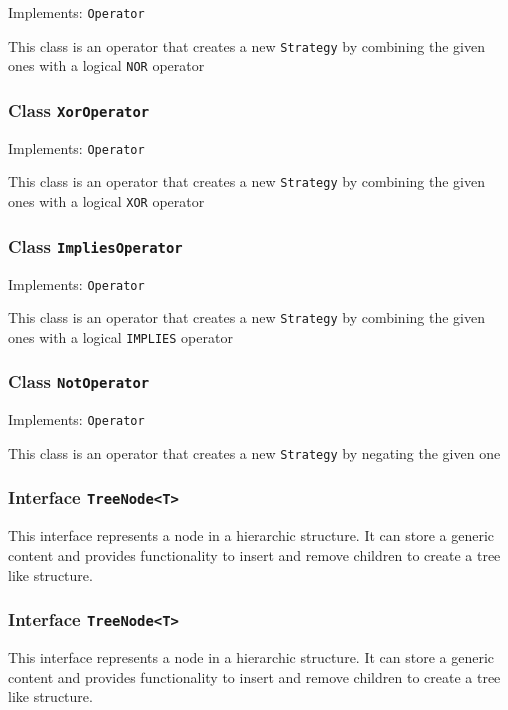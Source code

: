 \documentclass[parskip=full,11pt]{scrartcl}
\begin{document}
Implements: \texttt{Operator}

This class is an operator that creates a new \texttt{Strategy} by combining the given ones with a logical \texttt{NOR} operator

\subsubsection{Class \texttt{XorOperator}}

Implements: \texttt{Operator}

This class is an operator that creates a new \texttt{Strategy} by combining the given ones with a logical \texttt{XOR} operator

\subsubsection{Class \texttt{ImpliesOperator}}

Implements: \texttt{Operator}

This class is an operator that creates a new \texttt{Strategy} by combining the given ones with a logical \texttt{IMPLIES} operator

\subsubsection{Class \texttt{NotOperator}}

Implements: \texttt{Operator}

This class is an operator that creates a new \texttt{Strategy} by negating the given one

\subsubsection{Interface \texttt{TreeNode<T>}}

This interface represents a node in a hierarchic structure. It can store a generic content and provides functionality to insert and remove children to create a tree like structure.

\subsubsection{Interface \texttt{TreeNode<T>}}

This interface represents a node in a hierarchic structure. It can store a generic content and provides functionality to insert and remove children to create a tree like structure.
\end{document}
